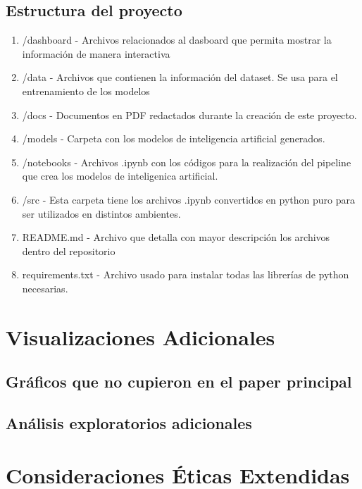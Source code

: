 \documentclass[conference]{IEEEtran}
\begin{document}
\subsection{Estructura del proyecto}
\begin{enumerate}
    \item /dashboard - Archivos relacionados al dasboard que permita mostrar la información de manera interactiva
    \item /data - Archivos que contienen la información del dataset. Se usa para el entrenamiento de los modelos
    \item /docs - Documentos en PDF redactados durante la creación de este proyecto.
    \item /models - Carpeta con los modelos de inteligencia artificial generados.
    \item /notebooks - Archivos .ipynb con los códigos para la realización del pipeline que crea los modelos de inteligenica artificial.
    \item /src - Esta carpeta tiene los archivos .ipynb convertidos en python puro para ser utilizados en distintos ambientes.
    \item README.md - Archivo que detalla con mayor descripción los archivos dentro del repositorio
    \item requirements.txt - Archivo usado para instalar todas las librerías de python necesarias.
\end{enumerate}

\section{Visualizaciones Adicionales}
\subsection{Gráficos que no cupieron en el paper principal}
\subsection{Análisis exploratorios adicionales}

\section{Consideraciones Éticas Extendidas}
\end{document}
